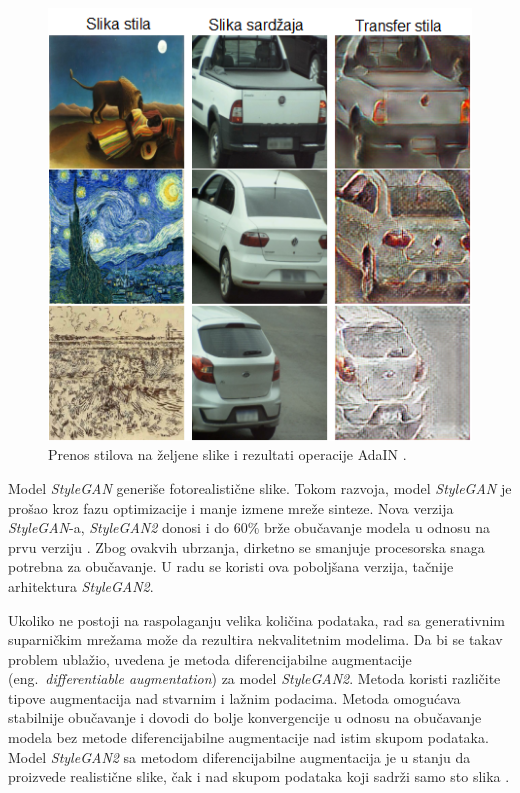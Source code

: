 \documentclass[12pt,oneside]{memoir}
\begin{document}
\begin{figure}[ht]
    \centering
    \includegraphics[width=1\textwidth]{matfmaster/glava2/adain_cus.png}
    \caption{Prenos stilova na željene slike i rezultati operacije AdaIN \cite{huang2017arbitrary}. }
    \label{fig:section2_augmentation_adain}
\end{figure}

Model \textit{StyleGAN} generiše fotorealistične slike. Tokom razvoja, model \textit{StyleGAN} je prošao kroz fazu optimizacije i manje izmene mreže sinteze. Nova verzija \textit{StyleGAN}-a, \textit{StyleGAN2} donosi i do 60\% brže obučavanje modela u odnosu na prvu verziju \cite{karras2020analyzing}. Zbog ovakvih ubrzanja, dirketno se smanjuje procesorska snaga potrebna za obučavanje. U radu se koristi ova poboljšana verzija, tačnije arhitektura \textit{StyleGAN2}. %

Ukoliko ne postoji na raspolaganju velika količina podataka, rad sa generativnim suparničkim mrežama može da rezultira nekvalitetnim modelima.
Da bi se takav problem ublažio, uvedena je metoda diferencijabilne augmentacije (eng.~\textit{differentiable augmentation}) za model \textit{StyleGAN2}. Metoda koristi različite tipove augmentacija nad stvarnim i lažnim podacima. Metoda omogućava stabilnije obučavanje i dovodi do bolje konvergencije u odnosu na obučavanje modela bez metode diferencijabilne augmentacije nad istim skupom podataka. Model \textit{StyleGAN2} sa metodom diferencijabilne augmentacija je u stanju da proizvede realistične slike, čak i nad skupom podataka koji sadrži samo sto slika \cite{zhao2020differentiable}.
\end{document}
